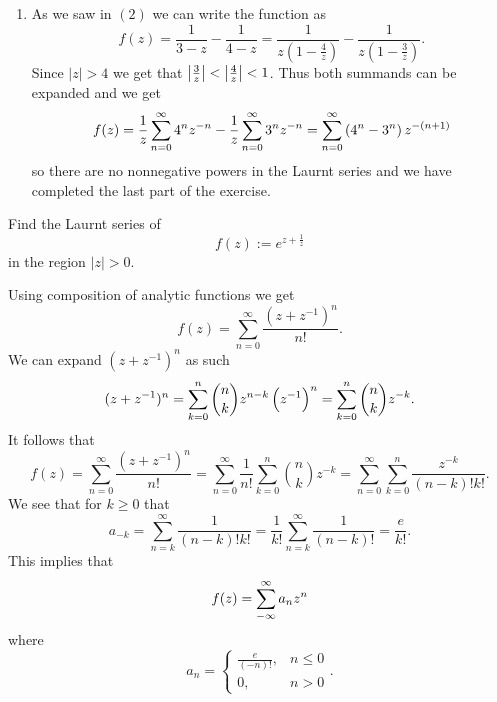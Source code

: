 \documentclass[11pt,a4paper]{article}
\begin{document}
\begin{solution}
\begin{enumerate}
\[    \]
  \item[(3)] As we saw in $(2)$ we can write the function as
    \[
      f(z) =
      \frac{1}{3 - z} - \frac{1}{4 - z} =
      \frac{1}{z \left(1 - \frac{4}{z}\right)} -
      \frac{1}{z \left(1 - \frac{3}{z}\right)}.
    \]
    Since $|z| > 4$ we get that $\left\lvert\frac{3}{z}\right\rvert < \left\lvert\frac{4}{z}\right\rvert < 1$.
    Thus both summands can be expanded and we get
    \[
      f(z) =
      \frac{1}{z} \sum_{n=0}^{\infty} 4^n z^{-n} -
      \frac{1}{z} \sum_{n=0}^{\infty} 3^n z^{-n} =
      \sum_{n=0}^{\infty} \del{4^n - 3^n} z^{- (n + 1)}
    \]
    so there are no nonnegative powers in the Laurnt series and we have
    completed the last part of the exercise.
\end{enumerate}
\end{solution}

\begin{exercise}
  Find the Laurnt series of
  \[
    f(z) := e^{z + \frac{1}{z}}
  \]
  in the region $|z| > 0$.
\end{exercise}
\begin{solution}
  Using composition of analytic functions we get
  \[
    f(z) =
    \sum_{n=0}^{\infty} \frac{(z + z^{-1})^n}{n!}.
  \]
  We can expand $(z +z^{-1})^n$ as such
  \[
    (z +z^{-1})^n =
    \sum_{k=0}^{n} \binom{n}{k} z^{n - k} \del{z^{-1}}^n =
    \sum_{k=0}^{n} \binom{n}{k} z^{- k}.
  \]
  It follows that
  \[
    f(z) =
    \sum_{n=0}^{\infty} \frac{(z + z^{-1})^n}{n!} =
    \sum_{n=0}^{\infty} \frac{1}{n!} \sum_{k=0}^{n} \binom{n}{k} z^{- k} =
    \sum_{n=0}^{\infty} \sum_{k=0}^{n} \frac{z^{-k}}{(n-k)! k!}.
  \]
  We see that for $k \geq 0$ that
  \[
    a_{-k} =
    \sum_{n=k}^{\infty} \frac{1}{(n - k)! k!} =
    \frac{1}{k!} \sum_{n=k}^{\infty} \frac{1}{(n - k)!} =
    \frac{e}{k!}.
  \]
  This implies that
  \[
    f(z) =
    \sum_{-\infty}^{\infty} a_n z^n
  \]
  where
  \[
    a_n =
    \begin{cases}
      \frac{e}{(-n)!}, &n \le 0 \\
      0, &n > 0
    \end{cases}.
  \]
\end{solution}
\end{document}

